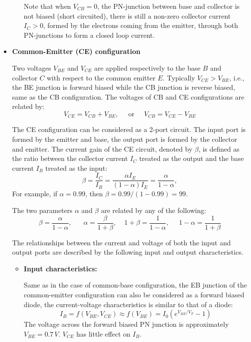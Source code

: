 \begin{itemize}
\begin{itemize}
    Note that when $V_{CB}=0$, the PN-junction between base and collector
    is not biased (short circuited), there is still a non-zero collector 
    current $I_C>0$, formed by the electrons coming from the emitter,
    through both PN-junctions to form a closed loop current.
    

  \end{itemize}

\item {\bf Common-Emitter (CE) configuration}

  Two voltages $V_{BE}$ and $V_{CE}$ are applied respectively to the base 
  $B$ and collector $C$ with respect to the common emitter $E$. Typically
  $V_{CE} > V_{BE}$, i.e., the BE junction is forward biased while the CB 
  junction is reverse biased, same as the CB configuration. The voltages 
  of CB and CE configurations are related by:
  \[ 
  V_{CE}=V_{CB}+V_{BE},\;\;\;\;\;\mbox{or}\;\;\;\;\;  V_{CB}=V_{CE}-V_{BE}
  \]


  The CE configuration can be considered as a 2-port circuit. The input
  port is formed by the emitter and base, the output port is formed by 
  the collector and emitter. The current gain of the CE circuit, denoted 
  by $\beta$, is defined as the ratio between the collector current $I_C$ 
  treated as the output and the base current $I_B$ treated as the input:  
  \[
  \beta=\frac{I_C}{I_B}=\frac{\alpha I_E}{(1-\alpha) I_E}=\frac{\alpha}{1-\alpha},
  \]
  For example, if $\alpha=0.99$, then $\beta=0.99/(1-0.99)=99$. 

  The two parameters $\alpha$ and $\beta$ are related by any of the 
  following:
  \[
  \beta=\frac{\alpha}{1-\alpha},\;\;\;\;\;\;\alpha=\frac{\beta}{1+\beta},
  \;\;\;\;1+\beta=\frac{1}{1-\alpha},\;\;\;\;\;1-\alpha=\frac{1}{1+\beta} 
  \]


  The relationships between the current and voltage of both the input 
  and output ports are described by the following input and output 
  characteristics.

  \begin{itemize}
  \item {\bf Input characteristics:} 

    Same as in the case of common-base configuration, the EB junction of the
    common-emitter configuration can also be considered as a forward biased
    diode, the current-voltage characteristics is similar to that of a diode:
    \[
    I_B=f(V_{BE},V_{CE})\approx f(V_{BE})=I_0 ( e^{V_{BE}/V_T}-1 )	
    \]
    The voltage across the forward biased PN junction is approximately 
    $V_{BE}=0.7\,V$. $V_{CE}$ has little effect on $I_B$.
    

\end{itemize}
\end{itemize}
